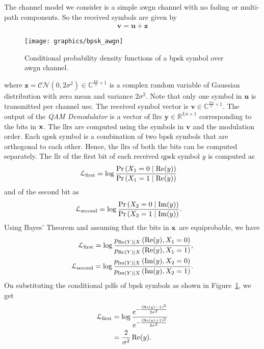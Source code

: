 The channel model we consider is a simple \ac{awgn} channel with no fading or multi-path components. So the received symbols are given by \begin{align}\mathbf{v}=\mathbf{u}+\mathbf{z}\end{align}
\begin{figure}[htbp]
  \centering
  \texttt{[image: graphics/bpsk\_awgn]}
  \caption{Conditional probability density functions of a \ac{bpsk} symbol over \ac{awgn} channel.}
  \label{fig:bpsk_awgn}
\end{figure}
where $\mathbf{z}=\mathcal{CN}(0,2\sigma^2)\in\mathbb{C}^{\frac{Ln}{o}\times 1}$ is a complex random variable of Gaussian distribution with zero mean and variance $2\sigma^2$. Note that only one symbol in $\mathbf{u}$ is transmitted per channel use. The received symbol vector is $\mathbf{v}\in\mathbb{C}^{\frac{Ln}{o}\times 1}$. The output of the \emph{QAM Demodulator} is a vector of \acp{llr} $\mathbf{y}\in\mathbb{R}^{Ln\times 1}$ corresponding to the bits in $\mathbf{x}$. The \acp{llr} are computed using the symbols in $\mathbf{v}$ and the modulation order. Each \ac{qpsk} symbol is a combination of two \ac{bpsk} symbols that are orthogonal to each other. Hence, the \acp{llr} of both the bits can be computed separately. The \ac{llr} of the first bit of each received \ac{qpsk} symbol $y$ is computed as
\begin{align}
\mathcal{L}_{\text{first}}&=\log\frac{\text{Pr}\left(X_1=0\mid\operatorname{Re}(y)\right)}{\text{Pr}\left(X_1=1\mid\operatorname{Re}(y)\right)}
\end{align}
and of the second bit as
\begin{align}
\mathcal{L}_{\text{second}}&=\log\frac{\text{Pr}\left(X_2=0\mid\operatorname{Im}(y)\right)}{\text{Pr}\left(X_2=1\mid\operatorname{Im}(y)\right)}.
\end{align}
Using Bayes' Theorem and assuming that the bits in $\mathbf{x}$ are equiprobable, we have
\begin{align}
\mathcal{L}_{\text{first}}=\log\frac{p_{\operatorname{Re}(Y)\mid X}\left(\operatorname{Re}(y), X_1=0\right)}{p_{\operatorname{Re}(Y)\mid X}\left(\operatorname{Re}(y), X_1=1\right)},\\
\mathcal{L}_{\text{second}}=\log\frac{p_{\operatorname{Im}(Y)\mid X}\left(\operatorname{Im}(y), X_2=0\right)}{p_{\operatorname{Im}(Y)\mid X}\left(\operatorname{Im}(y), X_2=1\right)}.
\end{align}
On substituting the conditional \acp{pdf} of \ac{bpsk} symbols as shown in Figure~\ref{fig:bpsk_awgn}, we get
\begin{align}
\mathcal{L}_{\text{first}}&=\log\frac{e^{-\frac{(\operatorname{Re}(y)-1)^2}{2\sigma^2}}}{e^{-\frac{(\operatorname{Re}(y)+1)^2}{2\sigma^2}}}\\
&=\frac{2}{\sigma^2}\operatorname{Re}(y)\label{eq:final_llr1}.
\end{align}
